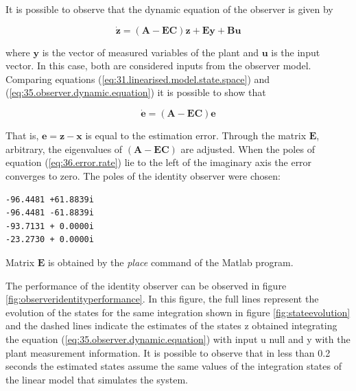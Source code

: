 \documentclass[sublist,a4paper,twoside,11pt]{article}
\begin{document}
It is possible to observe that the dynamic equation of the observer is given by

\begin{equation}\label{eq:35.observer.dynamic.equation}
\mathbf{\dot{z} = (A-EC)z+ Ey+Bu}
\end{equation}

where $\mathbf{y}$ is the vector of measured variables of the plant and $\mathbf{u}$ is the input vector. In this case, both are considered inputs from the observer model.
Comparing equations (\ref{eq:31.linearised.model.state.space}) and (\ref{eq:35.observer.dynamic.equation}) it is possible to show that

\begin{equation}\label{eq:36.error.rate}
\mathbf{\dot{e} = (A-EC)e}
\end{equation}


That is, $\mathbf{e = z-x}$ is equal to the estimation error. Through the matrix $\mathbf{E}$, arbitrary, the eigenvalues of $\mathbf{(A - EC)}$ are adjusted. When the poles of equation (\ref{eq:36.error.rate}) lie to the left of the imaginary axis the error converges to zero. The poles of the identity observer were chosen:

\begin{verbatim}
-96.4481 +61.8839i
-96.4481 -61.8839i
-93.7131 + 0.0000i
-23.2730 + 0.0000i
\end{verbatim}

Matrix $\mathbf{E}$ is obtained by the \emph{place} command of the Matlab program.

The performance of the identity observer can be observed in figure \ref{fig:observeridentityperformance}. In this figure, the full lines represent the evolution of the states for the same integration shown in figure \ref{fig:stateevolution} and the dashed lines indicate the estimates of the states z obtained integrating the equation (\ref{eq:35.observer.dynamic.equation}) with input u null and y with the plant measurement information. It is possible to observe that in less than 0.2 seconds the estimated states assume the same values of the integration states of the linear model that simulates the system.
\end{document}
